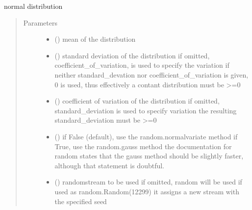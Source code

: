 \documentclass[letterpaper,10pt,english]{sphinxmanual}
\begin{document}

\begin{fulllineitems}
\label{\detokenize{Reference:salabim.Normal}}
normal distribution
\begin{quote}\begin{description}
\item[{Parameters}] \leavevmode\begin{itemize}
\item {} 
 () \textendash{} mean of the distribution

\item {} 
 () \textendash{} standard deviation of the distribution 
if omitted, coefficient\_of\_variation, is used to specify the variation
if neither standard\_devation nor coefficient\_of\_variation is given, 0 is used,
thus effectively a contant distribution 
must be \textgreater{}=0

\item {} 
 () \textendash{} coefficient of variation of the distribution 
if omitted, standard\_deviation is used to specify variation 
the resulting standard\_deviation must be \textgreater{}=0

\item {} 
 () \textendash{} if False (default), use the random.normalvariate method 
if True, use the random.gauss method 
the documentation for random states that the gauss method should be slightly faster,
although that statement is doubtful.

\item {} 
 () \textendash{} randomstream to be used 
if omitted, random will be used 
if used as random.Random(12299)
it assigns a new stream with the specified seed

\end{itemize}

\end{description}\end{quote}


\end{fulllineitems}
\end{document}
